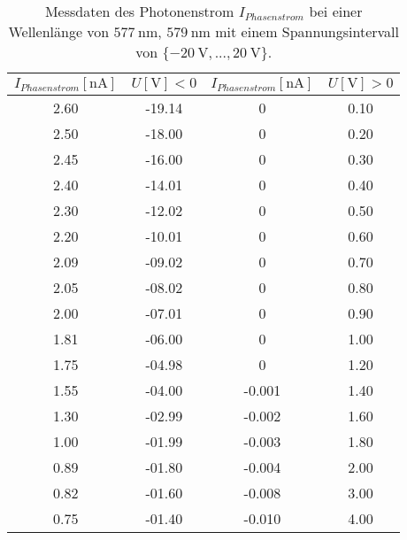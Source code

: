 
\begin{table}
    \centering
    \caption{Messdaten des Photonenstrom $I_{Phasenstrom}$ bei einer Wellenlänge von $\SI{577}{\nano\meter}$, $\SI{579}{\nano\meter}$ mit einem Spannungsintervall von $\{\SI{-20}{\volt},... ,\SI{20}{\volt}\}$.}
    \label{tab:tab1}
    \begin{tabular}{c c || c c}
        \toprule
        $I_{Phasenstrom}[\si{\nano\ampere}]$ & $U [\si{\volt}] < 0$ & $I_{Phasenstrom}[\si{\nano\ampere}]$ & $U [\si{\volt}] > 0$ \\
        \midrule
        2.60         &         -19.14  &  0            &           0.10    \\    
        2.50         &         -18.00  &  0            &           0.20    \\    
        2.45         &         -16.00  &  0            &           0.30    \\    
        2.40         &         -14.01  &  0            &           0.40    \\    
        2.30         &         -12.02  &  0            &           0.50    \\    
        2.20         &         -10.01  &  0            &           0.60    \\    
        2.09         &         -09.02  &  0            &           0.70    \\    
        2.05         &         -08.02  &  0            &           0.80    \\    
        2.00         &         -07.01  &  0            &           0.90    \\    
        1.81         &         -06.00  &  0            &           1.00    \\    
        1.75         &         -04.98  &  0            &           1.20    \\    
        1.55         &         -04.00  &  -0.001       &           1.40    \\    
        1.30         &         -02.99  &  -0.002       &           1.60    \\    
        1.00         &         -01.99  &  -0.003       &           1.80    \\    
        0.89         &         -01.80  &  -0.004       &           2.00    \\    
        0.82         &         -01.60  &  -0.008       &           3.00    \\    
        0.75         &         -01.40  &  -0.010       &           4.00    \\    

\end{tabular}
\end{table}
